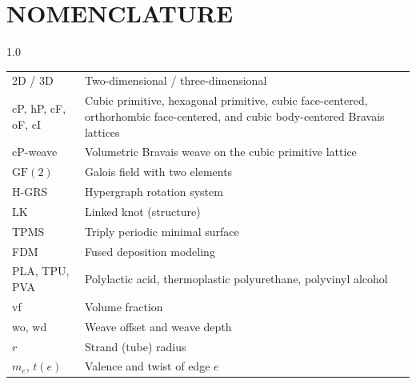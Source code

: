 %
%
%


\chapter*{NOMENCLATURE}

\hspace*{-1.25in}
\vspace{12pt}
\begin{spacing}{1.0}
	\begin{longtable}[htbp]{@{}p{} p{}@{}}
		2D / 3D & Two-dimensional / three-dimensional\\ [1ex]
		cP, hP, cF, oF, cI & Cubic primitive, hexagonal primitive, cubic face-centered, orthorhombic face-centered, and cubic body-centered Bravais lattices\\ [1ex]
		cP-weave & Volumetric Bravais weave on the cubic primitive lattice\\ [1ex]
		$\mathrm{GF}(2)$ & Galois field with two elements\\ [1ex]
		H-GRS & Hypergraph rotation system\\ [1ex]
		LK & Linked knot (structure)\\ [1ex]
		TPMS & Triply periodic minimal surface\\ [1ex]
		FDM & Fused deposition modeling\\ [1ex]
		PLA, TPU, PVA & Polylactic acid, thermoplastic polyurethane, polyvinyl alcohol\\ [1ex]
		vf & Volume fraction\\ [1ex]
		wo, wd & Weave offset and weave depth\\ [1ex]
		$r$ & Strand (tube) radius\\ [1ex]
		$m_e$, $t(e)$ & Valence and twist of edge $e$\\
	\end{longtable}
\end{spacing}

\pagebreak{}
